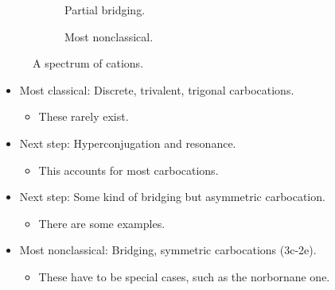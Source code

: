 \documentclass[../notes.tex]{subfiles}
\begin{document}
\begin{itemize}
\begin{figure}[h!]
\begin{subfigure}[b]{0.2\linewidth}
            \chemright{]^\oplus}
            \caption{Partial bridging.}
            \label{fig:CCspectrumc}
        \end{subfigure}
        \begin{subfigure}[b]{0.2\linewidth}
            \centering
            \chemleft{[}
            \chemright{]^\oplus}
            \caption{Most nonclassical.}
            \label{fig:CCspectrumd}
        \end{subfigure}
        \caption{A spectrum of cations.}
        \label{fig:CCspectrum}
    \end{figure}
    \begin{itemize}
        \item Most classical: Discrete, trivalent, trigonal carbocations.
        \begin{itemize}
            \item These rarely exist.
        \end{itemize}
        \item Next step: Hyperconjugation and resonance.
        \begin{itemize}
            \item This accounts for most carbocations.
        \end{itemize}
        \item Next step: Some kind of bridging but asymmetric carbocation.
        \begin{itemize}
            \item There are some examples.
        \end{itemize}
        \item Most nonclassical: Bridging, symmetric carbocations (3c-2e).
        \begin{itemize}
            \item These have to be special cases, such as the norbornane one.
        \end{itemize}
    \end{itemize}
\end{itemize}
\end{document}
